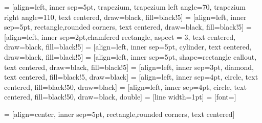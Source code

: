 \usetikzlibrary {intersections,through,arrows.meta,graphs,shapes.misc,positioning,shapes.misc,positioning,calc}
\usetikzlibrary{animations}
\usetikzlibrary {shapes.geometric}
\usetikzlibrary {animations}
\usetikzlibrary {shapes.multipart}
\usetikzlibrary {positioning}
\usetikzlibrary {fit,shapes.geometric}
\usetikzlibrary {automata}
\usetikzlibrary {quotes}
\usetikzlibrary {matrix}
\usetikzlibrary {backgrounds}
\usetikzlibrary {scopes}
\usetikzlibrary {calc}
\usetikzlibrary {intersections}
\usetikzlibrary {svg.path}
\usetikzlibrary {decorations}
\usetikzlibrary {patterns}
\usetikzlibrary {decorations.pathmorphing}
\usetikzlibrary {shadows}
\usetikzlibrary {bending}

 = [align=left, inner sep=5pt, trapezium, trapezium left angle=70, trapezium right angle=110, text centered, draw=black, fill=black!5]
 = [align=left, inner sep=5pt, rectangle,rounded corners, text centered, draw=black, fill=black!5]
 = [align=left, inner sep=2pt,chamfered rectangle, aspect = 3, text centered, draw=black, fill=black!5]
 = [align=left, inner sep=5pt, cylinder, text centered, draw=black, fill=black!5]
 = [align=left, inner sep=5pt, shape=rectangle callout, text centered, draw=black, fill=black!5]
 = [align=left, inner sep=3pt, diamond, text centered, fill=black!5, draw=black]
 = [align=left, inner sep=4pt, circle, text centered, fill=black!50, draw=black]
 = [align=left, inner sep=4pt, circle, text centered, fill=black!50, draw=black, double]
 = [line width=1pt]
 = [font=\normalsize]

 = [align=center, inner sep=5pt, rectangle,rounded corners, text centered]
